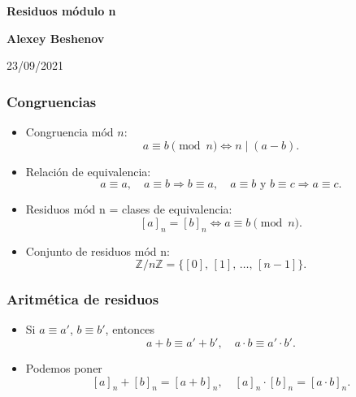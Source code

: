 \documentclass[handout]{beamer}
\newcommand{\ZZ}{\mathbb{Z}}
\begin{document}

\begin{frame}[noframenumbering]
  \begin{center}
    {\LARGE\bf Residuos módulo n

    }

    \vspace{3em}

    {\large\bf Alexey Beshenov}

    \vspace{4em}

    23/09/2021

  \end{center}
\end{frame}


\begin{frame}
  \frametitle{Congruencias}

  \begin{itemize}
    \item<2-> Congruencia mód $n$:
      \[ a \equiv b \pmod{n} \iff n \mid (a-b). \]

    \item<3-> Relación de equivalencia:
      \[
        a\equiv a, \quad
        a\equiv b \Rightarrow b\equiv a, \quad
        a\equiv b \text{ y } b\equiv c \Rightarrow a\equiv c.
      \]

    \item<4-> Residuos mód n = clases de equivalencia:
      $$[a]_n = [b]_n \iff a\equiv b \pmod{n}.$$

    \item<5-> Conjunto de residuos mód n:
      $$\ZZ/n\ZZ = \{ [0], \, [1], \, \ldots, \, [n-1] \}.$$
    \end{itemize}
\end{frame}


\begin{frame}
  \frametitle{Aritmética de residuos}

  \begin{itemize}
  \item<2-> Si $a \equiv a'$, $b \equiv b'$, entonces
    \[ a+b \equiv a'+b', \quad a\cdot b \equiv a'\cdot b'. \]

  \item<3-> Podemos poner
    \[ [a]_n + [b]_n = [a+b]_n, \quad [a]_n\cdot [b]_n = [a\cdot b]_n. \]
  \end{itemize}  
\end{frame}
\end{document}

